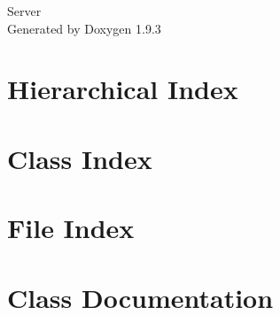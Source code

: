 \documentclass[twoside]{book}
\newcommand{\+}{\discretionary{\mbox{\scriptsize$\hookleftarrow$}}{}{}}
\newcommand{\clearemptydoublepage}{%
    \newpage{\pagestyle{empty}\cleardoublepage}%
  }
\begin{document}
  \raggedbottom
    \hypersetup{pageanchor=false,
                bookmarksnumbered=true,
                pdfencoding=unicode
               }
  \begin{titlepage}
  \vspace*{7cm}
  \begin{center}%
  {\Large Server}\\
  \vspace*{1cm}
  {\large Generated by Doxygen 1.9.3}\\
  \end{center}
  \end{titlepage}
  \clearemptydoublepage
  \tableofcontents
  \clearemptydoublepage
  \hypersetup{pageanchor=true}
\chapter{Hierarchical Index}

\chapter{Class Index}

\chapter{File Index}

\chapter{Class Documentation}













\end{document}
